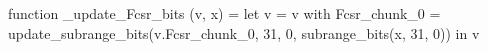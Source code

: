 function _update_Fcsr_bits (v, x) = let v = { v with Fcsr_chunk_0 = update_subrange_bits(v.Fcsr_chunk_0, 31, 0, subrange_bits(x, 31, 0)) } in
  v
